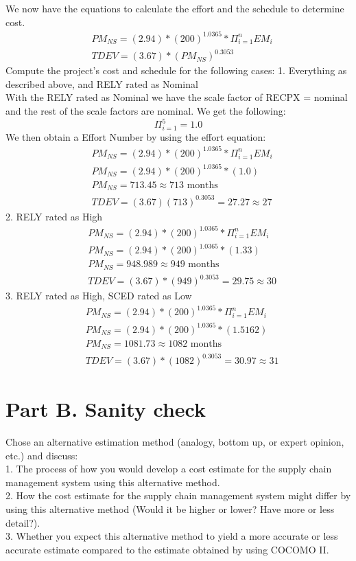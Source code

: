 \documentclass[12pt,letterpaper]{article}
\begin{document}
We now have the equations to calculate the effort and the schedule to determine cost.
    \begin{align*}
        &PM_{NS} = (2.94)*(200)^{1.0365} * \Pi_{i=1}^{n}EM_i\\
        &TDEV = (3.67)*(PM_{NS})^{0.3053}
    \end{align*}
Compute the project’s cost and schedule for the following cases:
1.	Everything as described above, and RELY rated as Nominal\\
With the RELY rated as Nominal we have the scale factor of RECPX = nominal and the rest of the scale factors are nominal. We get the following:
    \begin{equation*}
        \Pi_{i=1}^{5} = 1.0
    \end{equation*}
We then obtain a Effort Number by using the effort equation:
    \begin{align*}
        &PM_{NS} = (2.94)*(200)^{1.0365} * \Pi_{i=1}^{n}EM_i\\
        &PM_{NS} = (2.94)*(200)^{1.0365} * (1.0) \\
        &PM_{NS} = 713.45 \approx 713 \text{ months}\\
        &TDEV = (3.67)(713)^{0.3053} = 27.27 \approx 27 
    \end{align*}
2.	RELY rated as High\\
    \begin{align*}
        &PM_{NS} = (2.94)*(200)^{1.0365} * \Pi_{i=1}^{n}EM_i\\
        &PM_{NS} = (2.94)*(200)^{1.0365} * (1.33) \\
        &PM_{NS} =  948.989\approx 949  \text{ months}\\
        &TDEV = (3.67)*(949)^{0.3053} =  29.75\approx 30
    \end{align*}
3.	RELY rated as High, SCED rated as Low
    \begin{align*}
        &PM_{NS} = (2.94)*(200)^{1.0365} * \Pi_{i=1}^{n}EM_i\\
        &PM_{NS} = (2.94)*(200)^{1.0365} * (1.5162) \\
        &PM_{NS} =  1081.73\approx  1082\text{ months}\\
        &TDEV = (3.67)*(1082)^{0.3053} =  30.97\approx 31  
    \end{align*}
\section*{Part B. Sanity check}
Chose an alternative estimation method (analogy, bottom up, or expert opinion, etc.) and discuss:\\
1.	The process of how you would develop a cost estimate for the supply chain management system using this alternative method.\\
2.	How the cost estimate for the supply chain management system might differ by using this alternative method (Would it be higher or lower?  Have more or less detail?).\\
3.	Whether you expect this alternative method to yield a more accurate or less accurate estimate compared to the estimate obtained by using COCOMO II. \\
\end{document}
